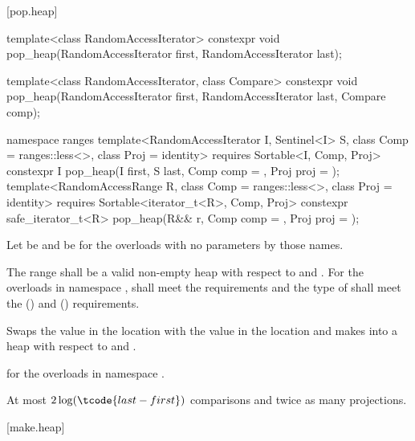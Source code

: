 [pop.heap]{}

%
\begin{itemdecl}
template<class RandomAccessIterator>
  constexpr void pop_heap(RandomAccessIterator first, RandomAccessIterator last);

template<class RandomAccessIterator, class Compare>
  constexpr void pop_heap(RandomAccessIterator first, RandomAccessIterator last,
                          Compare comp);

namespace ranges {
  template<RandomAccessIterator I, Sentinel<I> S, class Comp = ranges::less<>,
           class Proj = identity>
    requires Sortable<I, Comp, Proj>
    constexpr I
      pop_heap(I first, S last, Comp comp = {}, Proj proj = {});
  template<RandomAccessRange R, class Comp = ranges::less<>, class Proj = identity>
    requires Sortable<iterator_t<R>, Comp, Proj>
    constexpr safe_iterator_t<R>
      pop_heap(R&& r, Comp comp = {}, Proj proj = {});
}
\end{itemdecl}

\begin{itemdescr}
\pnum
Let  be 
and  be 
for the overloads with no parameters by those names.

\pnum
\requires
The range 
shall be a valid non-empty heap with respect to  and .
For the overloads in namespace ,
 shall meet
the  requirements and
the type of  shall meet
the  () and
 () requirements.

\pnum
\effects
Swaps the value in the location 
with the value in the location
and makes
into a heap with respect to  and .

\pnum
\returns
{} for the overloads in namespace .

\pnum
\complexity
At most $2 \log(\tcode{last - first})$ comparisons and
twice as many projections.
\end{itemdescr}

[make.heap]{}

